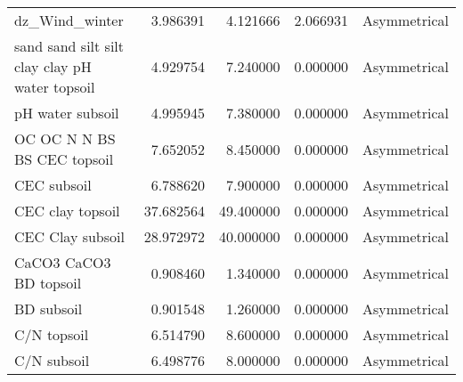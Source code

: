 \begin{tabular}{lrrrl}
dz_Wind_winter & 3.986391 & 4.121666 & 2.066931 & Asymmetrical \\
sand %
sand %
silt %
silt%
clay %
clay %
pH water topsoil & 4.929754 & 7.240000 & 0.000000 & Asymmetrical \\
pH water subsoil & 4.995945 & 7.380000 & 0.000000 & Asymmetrical \\
OC %
OC %
N %
N %
BS %
BS %
CEC topsoil & 7.652052 & 8.450000 & 0.000000 & Asymmetrical \\
CEC subsoil & 6.788620 & 7.900000 & 0.000000 & Asymmetrical \\
CEC clay topsoil & 37.682564 & 49.400000 & 0.000000 & Asymmetrical \\
CEC Clay subsoil & 28.972972 & 40.000000 & 0.000000 & Asymmetrical \\
CaCO3 %
CaCO3 %
BD topsoil & 0.908460 & 1.340000 & 0.000000 & Asymmetrical \\
BD subsoil & 0.901548 & 1.260000 & 0.000000 & Asymmetrical \\
C/N topsoil & 6.514790 & 8.600000 & 0.000000 & Asymmetrical \\
C/N subsoil & 6.498776 & 8.000000 & 0.000000 & Asymmetrical \\
\bottomrule
\end{tabular}

